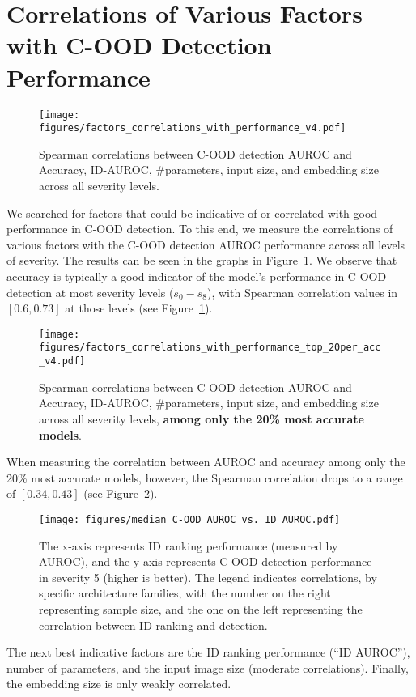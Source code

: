 \documentclass[table]{article} \usepackage{PRIMEarxiv}
\begin{document}
\section{Correlations of Various Factors with C-OOD Detection Performance}
\label{sec:correlations with C-OOD}

\begin{figure}[h]
    \centering
    \texttt{[image: figures/factors\_correlations\_with\_performance\_v4.pdf]}
    \caption{Spearman correlations between C-OOD detection AUROC and Accuracy,  ID-AUROC, \#parameters, input size, and embedding size across all severity levels.}
    \label{fig:models_factors_preformance_correlations}
\end{figure}
We searched for factors that could be indicative of or correlated
with good performance in C-OOD detection. To this end, we measure the correlations of 
various factors with the C-OOD detection AUROC performance across all levels of severity.
The results can be seen in the graphs in Figure~\ref{fig:models_factors_preformance_correlations}. 
We observe that accuracy is typically a good indicator of the model's performance in C-OOD detection at most severity levels ($s_0-s_8$), with Spearman correlation values in $[0.6, 0.73]$ at those levels (see Figure~\ref{fig:models_factors_preformance_correlations}).
\begin{figure}[h]
    \centering
    \texttt{[image: figures/factors\_correlations\_with\_performance\_top\_20per\_acc\_v4.pdf]}
    \caption{Spearman correlations between C-OOD detection AUROC and Accuracy,  ID-AUROC, \#parameters, input size, and embedding size across all severity levels, \textbf{among only the 20\% most accurate models}.}
    \label{fig:models_factors_preformance_correlations_top_acc}
\end{figure}
When measuring the correlation between AUROC and accuracy among only the 20\% most accurate models, however, the Spearman correlation drops to a range of $[0.34, 0.43]$ (see Figure~\ref{fig:models_factors_preformance_correlations_top_acc}).

\begin{figure}[htb]
    \centering
\texttt{[image: figures/median\_C-OOD\_AUROC\_vs.\_ID\_AUROC.pdf]}
    \caption{The x-axis represents ID ranking performance (measured by AUROC), and the y-axis represents C-OOD detection performance in severity 5 (higher is better). The legend indicates correlations, by specific architecture families, with the number on the right representing sample size, and the one on the left representing the correlation between ID ranking and detection.}
    \label{fig:ID-AUROC vs OOD AUROC}
\end{figure}
The next best indicative factors are the ID ranking performance (``ID AUROC''), number of parameters, and the input image size (moderate correlations). Finally, the embedding size is only weakly correlated.
\end{document}

